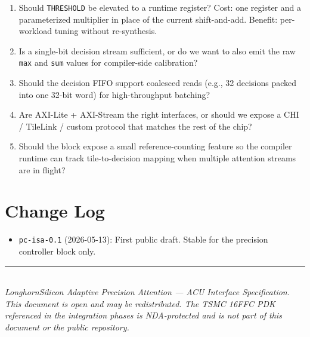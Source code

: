 \documentclass[11pt]{article}
\begin{document}
\begin{enumerate}
\item Should \texttt{THRESHOLD} be elevated to a runtime register? Cost: one
      register and a parameterized multiplier in place of the current
      shift-and-add. Benefit: per-workload tuning without re-synthesis.
\item Is a single-bit decision stream sufficient, or do we want to also
      emit the raw \texttt{max} and \texttt{sum} values for compiler-side
      calibration?
\item Should the decision FIFO support coalesced reads (e.g., 32 decisions
      packed into one 32-bit word) for high-throughput batching?
\item Are AXI-Lite + AXI-Stream the right interfaces, or should we expose a
      CHI / TileLink / custom protocol that matches the rest of the chip?
\item Should the block expose a small reference-counting feature so the
      compiler runtime can track tile-to-decision mapping when multiple
      attention streams are in flight?
\end{enumerate}

\section{Change Log}
\label{sec:changelog}

\begin{itemize}
\item \texttt{pc-isa-0.1} (2026-05-13): First public draft. Stable for the
      precision controller block only.
\end{itemize}

\vspace{0.5in}
\noindent\rule{\textwidth}{0.4pt}\\
\noindent\small\textit{LonghornSilicon Adaptive Precision Attention --- ACU Interface Specification.
This document is open and may be redistributed. The TSMC 16FFC PDK referenced
in the integration phases is NDA-protected and is not part of this document
or the public repository.}
\end{document}
